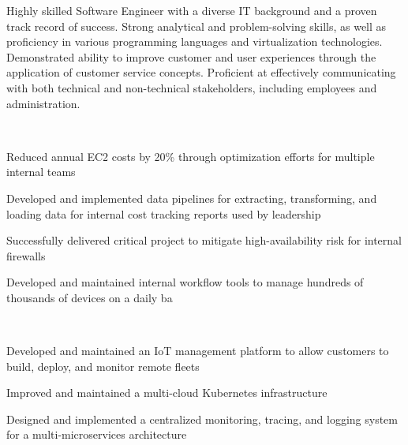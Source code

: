 \documentclass[a4paper]{my_cv}
\begin{document}
\begin{minipage}[t]{0.66\textwidth} 


Highly skilled Software Engineer with a diverse IT background and a proven track record of success. Strong analytical and problem-solving skills, as well as proficiency in various programming languages and virtualization technologies. Demonstrated ability to improve customer and user experiences through the application of customer service concepts. Proficient at effectively communicating with both technical and non-technical stakeholders, including employees and administration.


 \\
\vspace{\topsep} %
\begin{tightemize}
\item Reduced annual EC2 costs by 20\% through optimization efforts for multiple internal teams
\item Developed and implemented data pipelines for extracting, transforming, and loading data for internal cost tracking reports used by leadership
\item Successfully delivered critical project to mitigate high-availability risk for internal firewalls
\item Developed and maintained internal workflow tools to manage hundreds of thousands of devices on a daily ba
\end{tightemize}
\sectionsep

 \\
\vspace{\topsep} %
\begin{tightemize}
\item Developed and maintained an IoT management platform to allow customers to build, deploy, and monitor remote fleets
\item Improved and maintained a multi-cloud Kubernetes infrastructure
\item Designed and implemented a centralized monitoring, tracing, and logging system for a multi-microservices architecture
\end{tightemize}
\sectionsep


\end{minipage}
\end{document}
